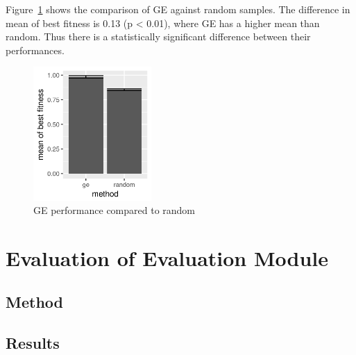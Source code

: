 Figure~\ref{fig:ge-random} shows the comparison of GE against random samples.
The difference in mean of best fitness is 0.13 (p < 0.01), where GE has a higher mean than random.
Thus there is a statistically significant difference between their performances.

\begin{figure}
    \centering
    \includegraphics[width=0.4\textwidth]{figures/ge-random}
    \caption{GE performance compared to random}
    \label{fig:ge-random}
\end{figure}

\section{Evaluation of Evaluation Module}
\subsection{Method}
\subsection{Results}
